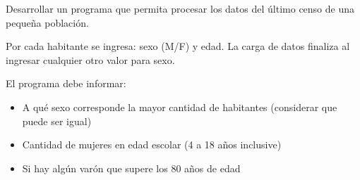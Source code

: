 Desarrollar un programa que permita procesar los datos del último censo de una pequeña población.

Por cada habitante se ingresa: sexo (M/F) y edad. La carga de datos finaliza al ingresar cualquier otro valor para sexo.

El programa debe informar:

\begin{itemize}
\item A qué sexo corresponde la mayor cantidad de habitantes (considerar que puede ser igual)
\item Cantidad de mujeres en edad escolar (4 a 18 años inclusive)
\item Si hay algún varón que supere los 80 años de edad
\end{itemize}
